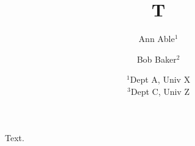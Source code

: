 \documentclass{article}
\author{Ann Able$^1$ \and Bob Baker$^2$}
\title{T}
\date{$^1$Dept A, Univ X\\ $^3$Dept C, Univ Z}
\begin{document}
\maketitle
Text.
\end{document}
